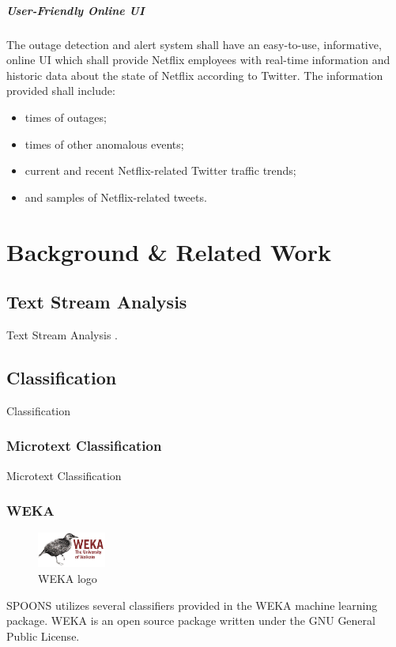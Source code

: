\documentclass[12pt]{ucthesis}
\begin{document}
\paragraph{User-Friendly Online UI}
The outage detection and alert system shall have an easy-to-use, informative,
online UI which shall provide Netflix employees with real-time information and
historic data about the state of Netflix according to Twitter. The information
provided shall include:

\begin{itemize}
   \item times of outages;
   \item times of other anomalous events;
   \item current and recent Netflix-related Twitter traffic trends;
   \item and samples of Netflix-related tweets.
\end{itemize}

\chapter{Background \& Related Work}
\label{background-related-work}

\section{Text Stream Analysis}
\label{background-text-stream}
Text Stream Analysis \cite{Bansal}\cite{Grinev}\cite{Huang}.

\section{Classification}
\label{background-classification}
Classification \cite{Pang}

\subsection{Microtext Classification}
\label{background-microtext-classification}
Microtext Classification \cite{hong}

\subsection{WEKA}
\label{background-weka}
\begin{figure}
  \begin{center}
    \includegraphics[width=0.20\textwidth]{images/weka.eps}
  \end{center}
  \caption{WEKA logo}
\end{figure}
SPOONS utilizes several classifiers provided in the WEKA machine learning package.
WEKA is an open source package written under the GNU General Public License\cite{weka}.
\end{document}
